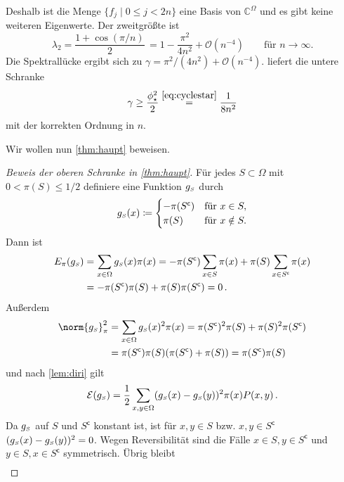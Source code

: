 \documentclass[ngerman,a4paper,11pt]{scrartcl}
\newcommand{\stcomp}[1]{{#1}^{\mathsf{c}}} %
\newcommand{\diri}{\mathcal{E}}
\newcommand{\CC}{\mathbb{C}}
\newcommand{\smallS}{{\mathchoice{}{}{\scriptscriptstyle}{}S}}
\begin{document}
\begin{exmpbk}[Träge Irrfahrt auf dem $2n$\=/Zykel]
 Deshalb ist die Menge $\{f_j\mid 0\leq j<2n\}$ eine Basis von $\CC^\Omega$ und es
 gibt keine weiteren Eigenwerte.
 Der zweitgrößte ist 
 \begin{equation*}
  \lambda_2=\frac{1+\cos(\pi/n)}{2}\, =1-\frac{\pi^2}{4n^2}+\mathcal{O}(n^{-4})\qquad\text{für $n\to\infty$.}
 \end{equation*}
 Die Spektrallücke ergibt sich zu $\gamma=\pi^2/(4n^2)+\mathcal{O}(n^{-4})$.
  liefert die untere Schranke
 \begin{equation*}
  \gamma\geq\frac{\phi_\star^2}{2}\overset{\eqref{eq:cyclestar}}{=}\frac{1}{8n^2} 
 \end{equation*}
 mit der korrekten Ordnung in $n$.
\end{exmpbk}

Wir wollen nun \cref{thm:haupt} beweisen.
\begin{proof}[Beweis der oberen Schranke in \cref{thm:haupt}]
 Für jedes $S\subset\Omega$ mit $0<\pi(S)\leq 1/2$ definiere eine Funktion $g_\smallS$ durch 
 \begin{equation*}
  g_\smallS(x)\coloneqq
  \begin{cases}
   -\pi(\stcomp{S})&\text{für }x\in S, \\
   \pi(S)&\text{für }x\notin S.
  \end{cases}
 \end{equation*}
 Dann ist
 \begin{align*}
  E_\pi(g_\smallS)&=\sum_{x\in\Omega}g_\smallS(x)\pi(x)=-\pi(\stcomp{S})\sum_{x\in S}\pi(x)+\pi(S)\sum_{x\in\stcomp{S}}\pi(x) \\
  &=-\pi(\stcomp{S})\pi(S)+\pi(S)\pi(\stcomp{S})=0\, .
 \end{align*}
 Außerdem
 \begin{align*}
  \norm{g_\smallS}_\pi^2&=\sum_{x\in\Omega}g_\smallS(x)^2\pi(x)=\pi(\stcomp{S})^2\pi(S)+\pi(S)^2\pi(\stcomp{S}) \\
  &=\pi(\stcomp{S})\pi(S)(\pi(\stcomp{S})+\pi(S))=\pi(\stcomp{S})\pi(S)
 \end{align*}
 und nach \cref{lem:diri} gilt
 \begin{align*}
  \diri(g_\smallS)=\frac{1}{2}\sum_{x,y\in\Omega}(g_\smallS(x)-g_\smallS(y))^2\pi(x)P(x,y) \, .
 \end{align*}
 Da $g_\smallS$ auf $S$ und $\stcomp{S}$ konstant ist, ist für $x,y\in S$ bzw.
 $x,y\in\stcomp{S}$ $(g_\smallS(x)-g_\smallS(y))^2=0$. Wegen Reversibilität sind die Fälle
 $x\in S,y\in\stcomp{S}$ und $y\in S,x\in\stcomp{S}$ symmetrisch. Übrig bleibt
 \begin{align*}

\end{align*}
\end{proof}
\end{document}
